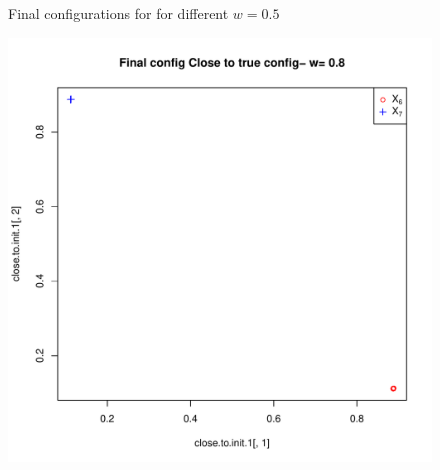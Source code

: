 \documentclass[12pt,oneside,final]{thesis}
\begin{document}
\begin{figure}
\begin{minipage}[b]{0.5\linewidth}
\label{fig:Finalconfig-MultMin-w-0_5_b}

\end{minipage}

\caption{Final configurations for for different $w=0.5$ }
\label{fig:Finalconfig-MultMin-w-0_5}

\end{figure}

\begin{figure}
\begin{minipage}[b]{0.5\linewidth}
\centering
\includegraphics[scale=0.45]{true-min-w0_8.pdf}
\label{fig:Finalconfig-MultMin-w-0_8_a}



\end{minipage}
\end{figure}
\end{document}
